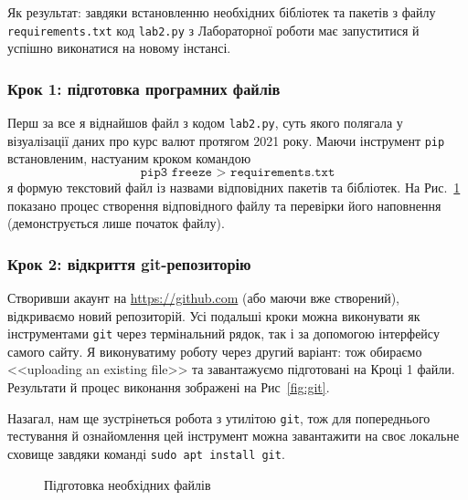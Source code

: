 \documentclass[a4paper,14pt]{extarticle} %
\begin{document}
Як результат: завдяки встановленню необхідних бібліотек та пакетів з файлу \texttt{requirements.txt} код 
\texttt{lab2.py} з Лабораторної роботи  має запуститися й успішно виконатися на новому інстансі. 

\subsubsection*{Крок 1: підготовка програмних файлів}

Перш за все я віднайшов файл з кодом \texttt{lab2.py}, суть якого полягала у візуалізації даних про курс валют 
протягом 2021 року. Маючи інструмент \texttt{pip} встановленим, настуаним кроком командою 
\[ \texttt{pip3 freeze > requirements.txt} \]
я формую текстовий файл із назвами відповідних пакетів та бібліотек. На Рис.~\ref{fig:git:prepare files} 
показано процес створення відповідного файлу та перевірки його наповнення (демонструється лише початок файлу).

\subsubsection*{Крок 2: відкриття git-репозиторію}

Створивши акаунт на \url{https://github.com} (або маючи вже створений), відкриваємо новий репозиторій. Усі 
подальші кроки можна виконувати як інструментами \texttt{git} через термінальний рядок, так і за допомогою 
інтерфейсу самого сайту. Я виконуватиму роботу через другий варіант: тож обираємо <<uploading an existing file>> 
та завантажуємо підготовані на Кроці 1 файли. Результати й процес виконання зображені на Рис~\ref{fig:git}.

Назагал, нам ще зустрінеться робота з утилітою \texttt{git}, тож для попереднього тестування й 
ознайомлення цей інструмент можна завантажити на своє локальне сховище завдяки команді 
\texttt{sudo apt install git}.

\begin{figure}[H]
    \caption{Підготовка необхідних файлів}
    \label{fig:git:prepare files}
\end{figure}
\end{document}
